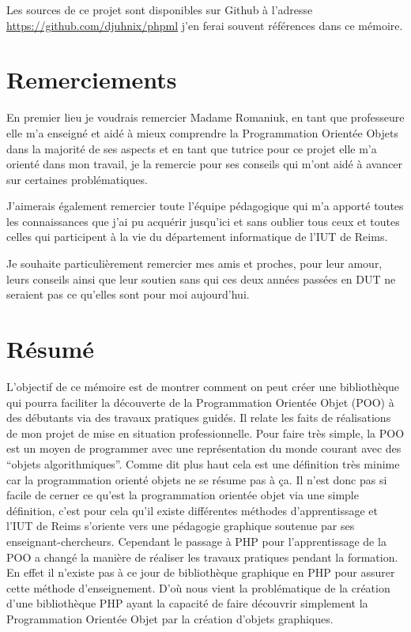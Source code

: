 \documentclass[11pt,a4paper,krantz2,11pt,oneside]{krantz}
\begin{document}
Les sources de ce projet sont disponibles sur Github à l'adresse \url{https://github.com/djuhnix/phpml} j'en ferai souvent références dans ce mémoire.

\mainmatter

\hypertarget{remerciements}{%
\chapter*{Remerciements}\label{remerciements}}


En premier lieu je voudrais remercier Madame Romaniuk, en tant que professeure elle m'a enseigné et aidé à mieux comprendre la Programmation Orientée Objets dans la majorité de ses aspects et en tant que tutrice pour ce projet elle m'a orienté dans mon travail, je la remercie pour ses conseils qui m'ont aidé à avancer sur certaines problématiques.

J'aimerais également remercier toute l'équipe pédagogique qui m'a apporté toutes les connaissances que j'ai pu acquérir jusqu'ici et sans oublier tous ceux et toutes celles qui participent à la vie du département informatique de l'IUT de Reims.

Je souhaite particulièrement remercier mes amis et proches, pour leur amour, leurs conseils ainsi que leur soutien sans qui ces deux années passées en DUT ne seraient pas ce qu'elles sont pour moi aujourd'hui.

\mainmatter

\hypertarget{ruxe9sumuxe9}{%
\chapter*{Résumé}\label{ruxe9sumuxe9}}


L'objectif de ce mémoire est de montrer comment on peut créer une bibliothèque qui pourra faciliter la découverte de la Programmation Orientée Objet (POO) à des débutants via des travaux pratiques guidés. Il relate les faits de réalisations de mon projet de mise en situation professionnelle. Pour faire très simple, la POO est un moyen de programmer avec une représentation du monde courant avec des ``objets algorithmiques''. Comme dit plus haut cela est une définition très minime car la programmation orienté objets ne se résume pas à ça. Il n'est donc pas si facile de cerner ce qu'est la programmation orientée objet via une simple définition, c'est pour cela qu'il existe différentes méthodes d'apprentissage et l'IUT de Reims s'oriente vers une pédagogie graphique soutenue par ses enseignant-chercheurs. Cependant le passage à PHP pour l'apprentissage de la POO a changé la manière de réaliser les travaux pratiques pendant la formation. En effet il n'existe pas à ce jour de bibliothèque graphique en PHP pour assurer cette méthode d'enseignement. D'où nous vient la problématique de la création d'une bibliothèque PHP ayant la capacité de faire découvrir simplement la Programmation Orientée Objet par la création d'objets graphiques.
\end{document}
